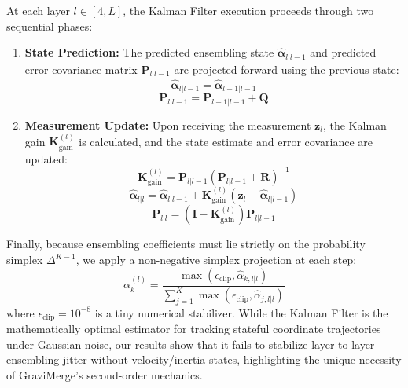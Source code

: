 At each layer $l \in [4, L]$, the Kalman Filter execution proceeds through two sequential phases:
\begin{enumerate}
    \item \textbf{State Prediction: } The predicted ensembling state $\hat{\boldsymbol{\alpha}}_{l|l-1}$ and predicted error covariance matrix $\mathbf{P}_{l|l-1}$ are projected forward using the previous state:
    \begin{equation}
        \hat{\boldsymbol{\alpha}}_{l|l-1} = \hat{\boldsymbol{\alpha}}_{l-1|l-1}
    \end{equation}
    \begin{equation}
        \mathbf{P}_{l|l-1} = \mathbf{P}_{l-1|l-1} + \mathbf{Q}
    \end{equation}
    \item \textbf{Measurement Update: } Upon receiving the measurement $\mathbf{z}_l$, the Kalman gain $\mathbf{K}_{\text{gain}}^{(l)}$ is calculated, and the state estimate and error covariance are updated:
    \begin{equation}
        \mathbf{K}_{\text{gain}}^{(l)} = \mathbf{P}_{l|l-1} \left( \mathbf{P}_{l|l-1} + \mathbf{R} \right)^{-1}
    \end{equation}
    \begin{equation}
        \hat{\boldsymbol{\alpha}}_{l|l} = \hat{\boldsymbol{\alpha}}_{l|l-1} + \mathbf{K}_{\text{gain}}^{(l)} \left( \mathbf{z}_l - \hat{\boldsymbol{\alpha}}_{l|l-1} \right)
    \end{equation}
    \begin{equation}
        \mathbf{P}_{l|l} = \left( \mathbf{I} - \mathbf{K}_{\text{gain}}^{(l)} \right) \mathbf{P}_{l|l-1}
    \end{equation}
\end{enumerate}
Finally, because ensembling coefficients must lie strictly on the probability simplex $\Delta^{K-1}$, we apply a non-negative simplex projection at each step:
\begin{equation}
    \alpha_k^{(l)} = \frac{\max(\epsilon_{\text{clip}}, \hat{\alpha}_{k, l|l})}{\sum_{j=1}^K \max(\epsilon_{\text{clip}}, \hat{\alpha}_{j, l|l})}
\end{equation}
where $\epsilon_{\text{clip}} = 10^{-8}$ is a tiny numerical stabilizer. While the Kalman Filter is the mathematically optimal estimator for tracking stateful coordinate trajectories under Gaussian noise, our results show that it fails to stabilize layer-to-layer ensembling jitter without velocity/inertia states, highlighting the unique necessity of GraviMerge's second-order mechanics.

